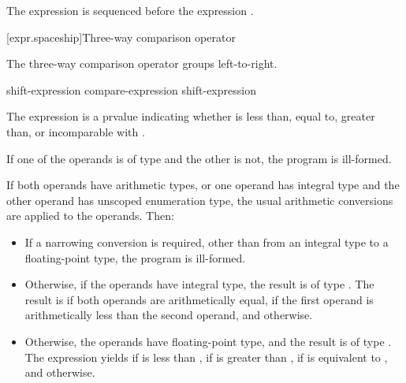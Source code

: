 \pnum
The expression  is sequenced before the expression .

[expr.spaceship]{Three-way comparison operator}
%
%

\pnum
The three-way comparison operator groups left-to-right.

%
%
%

\begin{bnf}
\br
    shift-expression\br
    compare-expression \terminal{<=>} shift-expression
\end{bnf}

\pnum
The expression  is a prvalue indicating whether
 is less than, equal to, greater than, or incomparable with
.

\pnum
If one of the operands is of type 
and the other is not, the program is ill-formed.

\pnum
If both operands have arithmetic types,
or one operand has integral type and
the other operand has unscoped enumeration type,
the usual arithmetic conversions are applied to the operands.
Then:

\begin{itemize}
\item
If a narrowing conversion is required,
other than from an integral type to a floating-point type,
the program is ill-formed.

\item
Otherwise, if the operands have integral type,
the result is of type .
The result is
if both operands are arithmetically equal,
if the first operand is arithmetically
less than the second operand,
and
otherwise.
\item
Otherwise, the operands have floating-point type, and
the result is of type .
The expression  yields
if  is less than ,
if  is greater than ,
if  is equivalent to ,
and
 otherwise.
\end{itemize}


